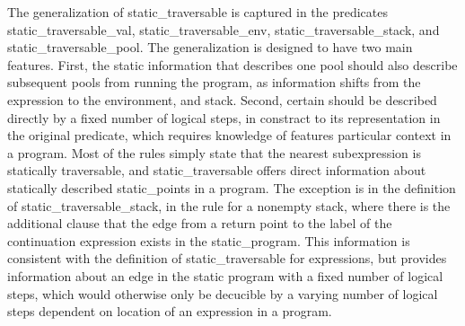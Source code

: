 \documentclass{article}
\begin{document}
The generalization of static\_traversable is captured in the predicates static\_traversable\_val,
static\_traversable\_env, static\_traversable\_stack, and static\_traversable\_pool.  The
generalization is designed to have two main features.  First, the static information that
describes one pool should also describe subsequent pools from running the program, as
information shifts from the expression to the environment, and stack.  Second, certain should
be described directly by a fixed number of logical steps, in constract to its representation in
the original predicate, which requires knowledge of features particular context in a program.
Most of the rules simply state that the nearest subexpression is statically traversable, and
static\_traversable offers direct information about statically described static\_points in a program.
The exception is in the definition of static\_traversable\_stack, in the rule for a nonempty
stack, where there is the additional clause that the edge from a return point to the label of
the continuation expression exists in the static\_program.  This information is consistent with the
definition of static\_traversable for expressions, but provides information about an edge in the
static program with a fixed number of logical steps, which would otherwise only be decucible by a
varying number of logical steps dependent on location of an expression in a program.
\end{document}
